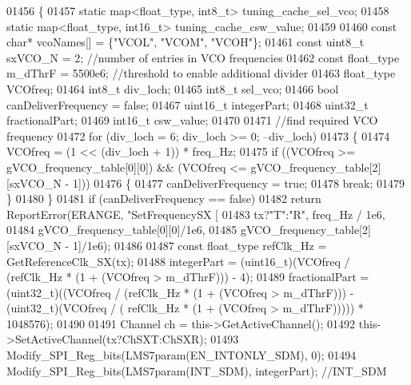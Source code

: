 \begin{DoxyCode}
{{{{{{{{{{{{{{{{{{{{{{{{{{{{{{{{{{{{{{{{{{01456 \{
01457     \textcolor{keyword}{static} map<float\_type, int8\_t> tuning\_cache\_sel\_vco;
01458     \textcolor{keyword}{static} map<float\_type, int16\_t> tuning\_cache\_csw\_value;
01459 
01460     \textcolor{keyword}{const} \textcolor{keywordtype}{char}* vcoNames[] = \{\textcolor{stringliteral}{"VCOL"}, \textcolor{stringliteral}{"VCOM"}, \textcolor{stringliteral}{"VCOH"}\};
01461     \textcolor{keyword}{const} uint8\_t sxVCO\_N = 2; \textcolor{comment}{//number of entries in VCO frequencies}
01462     \textcolor{keyword}{const} float_type m\_dThrF = 5500e6; \textcolor{comment}{//threshold to enable additional divider}
01463     float_type VCOfreq;
01464     int8\_t div\_loch;
01465     int8\_t sel\_vco;
01466     \textcolor{keywordtype}{bool} canDeliverFrequency = \textcolor{keyword}{false};
01467     uint16\_t integerPart;
01468     uint32\_t fractionalPart;
01469     int16\_t csw\_value;
01470 
01471     \textcolor{comment}{//find required VCO frequency}
01472     \textcolor{keywordflow}{for} (div\_loch = 6; div\_loch >= 0; --div\_loch)
01473     \{
01474         VCOfreq = (1 << (div\_loch + 1)) * freq\_Hz;
01475         \textcolor{keywordflow}{if} ((VCOfreq >= gVCO_frequency_table[0][0]) && (VCOfreq <= 
      gVCO_frequency_table[2][sxVCO\_N - 1]))
01476         \{
01477             canDeliverFrequency = \textcolor{keyword}{true};
01478             \textcolor{keywordflow}{break};
01479         \}
01480     \}
01481     \textcolor{keywordflow}{if} (canDeliverFrequency == \textcolor{keyword}{false})
01482         \textcolor{keywordflow}{return} ReportError(ERANGE, \textcolor{stringliteral}{"SetFrequencySX%
       [%
01483                             tx?\textcolor{stringliteral}{"T"}:\textcolor{stringliteral}{"R"}, freq\_Hz / 1e6,
01484                             gVCO_frequency_table[0][0]/1e6,
01485                             gVCO_frequency_table[2][sxVCO\_N - 1]/1e6);
01486 
01487     \textcolor{keyword}{const} float_type refClk\_Hz = GetReferenceClk_SX(tx);
01488     integerPart = (uint16\_t)(VCOfreq / (refClk\_Hz * (1 + (VCOfreq > m\_dThrF))) - 4);
01489     fractionalPart = (uint32\_t)((VCOfreq / (refClk\_Hz * (1 + (VCOfreq > m\_dThrF))) - (uint32\_t)(VCOfreq / (
      refClk\_Hz * (1 + (VCOfreq > m\_dThrF))))) * 1048576);
01490 
01491     Channel ch = this->GetActiveChannel();
01492     this->SetActiveChannel(tx?ChSXT:ChSXR);
01493     Modify_SPI_Reg_bits(LMS7param(EN_INTONLY_SDM), 0);
01494     Modify_SPI_Reg_bits(LMS7param(INT_SDM), integerPart); \textcolor{comment}{//INT\_SDM}
}}}}}}}}}}}}}}}}}}}}}}}}}}}}}}}}}}}}}}}}}}}
\end{DoxyCode}
